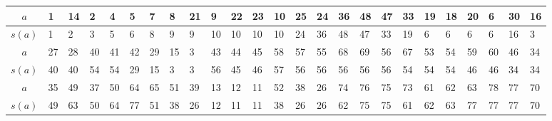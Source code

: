 \begin{center}
\begin{minipage}{\textwidth}
\renewcommand{\arraystretch}{1.15}
\begin{scriptsize}
\begin{tabular}{|c|*{24}{|p{.15cm}}|}
\hline
$a$&1&14&2&4&5&7&8&21&9&22&23&10&25&24&36&48&47&33&19&18&20&6&30&16 \\
\hline
$s(a)$&1&2&3&5&6&8&9&9&10&10&10&10&24&36&48&47&33&19&6&6&6&6&16&3\\
\hline \hline
$a$&27&28&40&41&42&29&15&3&43&44&45&58&57&55&68&69&56&67&53&54&59&60&46&34\\
\hline
$s(a)$&40&40&54&54&29&15&3&3&56&45&46&57&56&56&56&56&56&54&54&54&46&46&34&34\\
\hline \hline
$a$&35&49&37&50&64&65&51&39&13&12&11&52&38&26&74&76&75&73&61&62&63&78&77&70\\
\hline
$s(a)$&49&63&50&64&77&51&38&26&12&11&11&38&26&26&62&75&75&61&62&63&77&77&77&70\\
\hline
\end{tabular}
\label{Beispiel_HO_Maximalmengen}
\end{scriptsize} 
\renewcommand{\arraystretch}{1}


\end{minipage}
\end{center}
